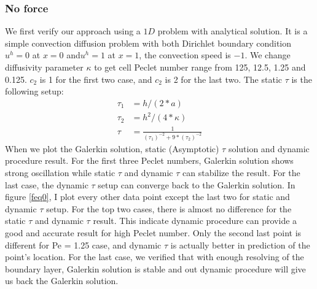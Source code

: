 \documentclass[10pt]{article}
\begin{document}
\subsubsection{No force}
We first verify our approach using a $1D$ problem with analytical solution. It is a simple convection diffusion problem with both Dirichlet boundary condition $u^{h} = 0$ at $x=0$ and$u^{h} = 1$ at $x=1$, the convection speed is $-1$. We change diffusivity parameter $\kappa$ to get cell Peclet number range from 125, 12.5, 1.25 and 0.125. $c_2$ is 1 for the first two case, and $c_2$ is 2 for the last two.
The static $\tau$ is the following setup:
\begin{equation}
    \begin{aligned}
       \tau_1  &= h/(2*a) \\
       \tau_2  &= h^2/(4*\kappa) \\
       \tau &=\frac{1}{(\tau_1)^{-2}+9*(\tau_2)^{-2}}
    \end{aligned}\label{eq:2} 
\end{equation}
When we plot the Galerkin solution, static (Asymptotic) $\tau$ solution and dynamic procedure result. For the first three Peclet numbers, Galerkin solution shows strong oscillation while static $\tau$ and dynamic $\tau$ can stabilize the result. For the last case, the dynamic $\tau$ setup can converge back to the Galerkin solution. In figure \ref{feq0}, I plot every other data point except the last two for static and dynamic $\tau$ setup.  For the top two cases, there is almost no difference for the static $\tau$ and dynamic $\tau$ result. This indicate dynamic procedure can provide a good and accurate result for high Peclet number. Only the second last point is different for Pe = 1.25 case, and dynamic $\tau$ is actually better in prediction of the point's location. For the last case, we verified that with enough resolving of the boundary layer, Galerkin solution is stable and out dynamic procedure will give us back the Galerkin solution.
\end{document}
